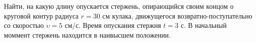 Найти, на какую длину опускается стержень,
опирающийся своим концом о круговой контур радиуса $r = 30$ см
кулака, движущегося возвратно-поступательно со скоростью $\upsilon = 5$ см/с.
Время опускания стержня $t = 3$ с.
В начальный моммент стержень находится в наивысшем положении.
